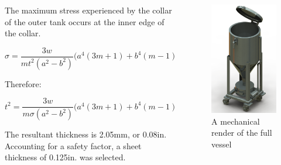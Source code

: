 \documentclass[final]{beamer}
\newlength{\onecolwid}
\newlength{\twocolwid}
\begin{document}
\begin{frame}[t]
\begin{columns}[t]
\begin{column}{\twocolwid}
\begin{columns}[t,totalwidth=\twocolwid]
\begin{column}{\onecolwid}
The maximum stress experienced by the collar of the outer tank occurs at the inner edge of the collar. 

\scriptsize
\begin{equation}
\sigma = \frac{3w}{mt^{2}(a^{2} - b^{2})}\Big(a^{4}(3m + 1) + b^{4}(m - 1) - 4ma^{2}b^{2} - 4(m + 1)a^{2}b^{2}\ln(\frac{a}{b}) \Big)
\label{eq:stress}
\end{equation}
\normalsize

\noindent Therefore:

\scriptsize
\begin{equation}
t^{2} = \frac{3w}{m\sigma(a^{2} - b^{2})}\Big(a^{4}(3m + 1) + b^{4}(m - 1) - 4ma^{2}b^{2} - 4(m + 1)a^{2}b^{2}\ln(\frac{a}{b}) \Big)
\end{equation}
\normalsize

The resultant thickness is 2.05mm, or 0.08in. Accounting for a safety factor, a sheet thickness of 0.125in. was selected.


\end{column} %

\begin{column}{\onecolwid}\vspace{-.6in} %


\begin{figure}
\includegraphics[width=0.6\linewidth]{full-vessel-render.png}
\caption{A mechanical render of the full vessel}
\end{figure}


\end{column}
\end{columns}
\end{column}
\end{columns}
\end{frame}
\end{document}

